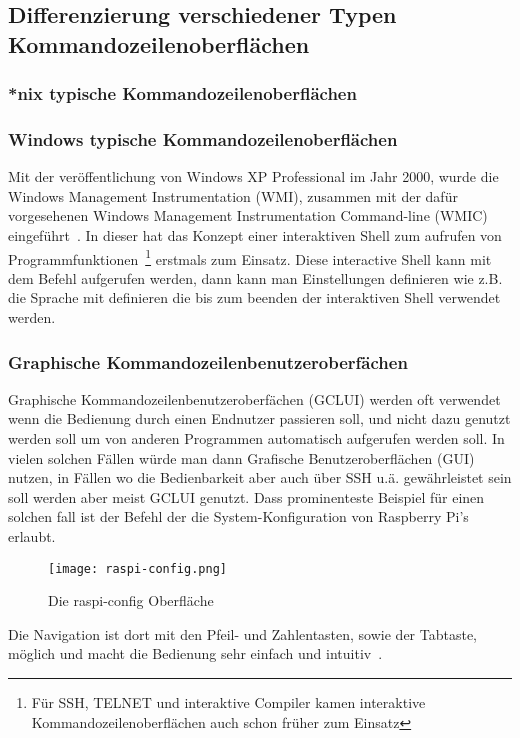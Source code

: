  \subsection{Differenzierung verschiedener Typen Kommandozeilenoberflächen}\label{subsec:DifferentCLITypes}
 \subsubsection{*nix typische Kommandozeilenoberflächen}
 \subsubsection{Windows typische Kommandozeilenoberflächen}
 Mit der veröffentlichung von Windows XP Professional im Jahr 2000, wurde die Windows Management Instrumentation (WMI),
 zusammen mit der dafür vorgesehenen Windows Management Instrumentation Command-line (WMIC) eingeführt~\cite{WMIProgrammingBlogPost}.
 In dieser hat das Konzept einer interaktiven Shell zum aufrufen von
 Programmfunktionen~\footnote{F\"ur SSH, TELNET und interaktive Compiler kamen interaktive Kommandozeilenoberfl\"achen auch schon fr\"uher zum Einsatz} erstmals zum Einsatz.
 Diese interactive Shell kann mit dem  Befehl aufgerufen werden, dann kann man Einstellungen definieren wie
 z.B. die Sprache mit  definieren die bis zum beenden der interaktiven Shell verwendet werden.
 \subsubsection{Graphische Kommandozeilenbenutzeroberfächen}
 Graphische Kommandozeilenbenutzeroberfächen (GCLUI) werden oft verwendet wenn die Bedienung durch einen Endnutzer passieren soll,
 und nicht dazu genutzt werden soll um von anderen Programmen automatisch aufgerufen werden soll.
 In vielen solchen Fällen würde man dann Grafische Benutzeroberflächen (GUI) nutzen, in Fällen wo die Bedienbarkeit aber auch über SSH u.ä. gewährleistet sein soll werden aber meist GCLUI genutzt.
 Dass prominenteste Beispiel für einen solchen fall ist der  Befehl der die System-Konfiguration von Raspberry Pi's erlaubt.
 \begin{figure}[H]
\texttt{[image: raspi-config.png]}
\caption{Die raspi-config Oberfläche}
\label{fig:raspi-config}
 \end{figure}
 Die Navigation ist dort mit den Pfeil- und Zahlentasten, sowie der Tabtaste, möglich und macht die Bedienung sehr einfach und intuitiv~\cite{RaspiConfigOfficialInfo}.
